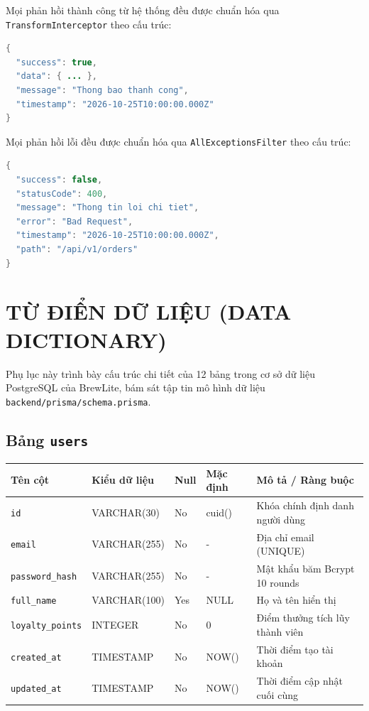 \documentclass[12pt,a4paper,oneside]{report}
\begin{document}
Mọi phản hồi thành công từ hệ thống đều được chuẩn hóa qua \texttt{Transform}\allowbreak\texttt{Interceptor} theo cấu trúc:
\begin{lstlisting}[language=Java]
{
  "success": true,
  "data": { ... },
  "message": "Thong bao thanh cong",
  "timestamp": "2026-10-25T10:00:00.000Z"
}
\end{lstlisting}

Mọi phản hồi lỗi đều được chuẩn hóa qua \texttt{AllExceptions}\allowbreak\texttt{Filter} theo cấu trúc:
\begin{lstlisting}[language=Java]
{
  "success": false,
  "statusCode": 400,
  "message": "Thong tin loi chi tiet",
  "error": "Bad Request",
  "timestamp": "2026-10-25T10:00:00.000Z",
  "path": "/api/v1/orders"
}
\end{lstlisting}



\chapter{TỪ ĐIỂN DỮ LIỆU (DATA DICTIONARY)}
\label{app:data-dictionary}

Phụ lục này trình bày cấu trúc chi tiết của 12 bảng trong cơ sở dữ liệu PostgreSQL của BrewLite, bám sát tập tin mô hình dữ liệu \texttt{backend/prisma/schema.prisma}.

\section{Bảng \texttt{users}}
\begin{table}[H]
\centering
\small
\begin{tabularx}{\textwidth}{llllX}
\toprule
\textbf{Tên cột} & \textbf{Kiểu dữ liệu} & \textbf{Null} & \textbf{Mặc định} & \textbf{Mô tả / Ràng buộc} \\
\midrule
\texttt{id} & VARCHAR(30) & No & cuid() & Khóa chính định danh người dùng \\
\texttt{email} & VARCHAR(255) & No & - & Địa chỉ email (UNIQUE) \\
\texttt{password\_hash} & VARCHAR(255) & No & - & Mật khẩu băm Bcrypt 10 rounds \\
\texttt{full\_name} & VARCHAR(100) & Yes & NULL & Họ và tên hiển thị \\
\texttt{loyalty\_points} & INTEGER & No & 0 & Điểm thưởng tích lũy thành viên \\
\texttt{created\_at} & TIMESTAMP & No & NOW() & Thời điểm tạo tài khoản \\
\texttt{updated\_at} & TIMESTAMP & No & NOW() & Thời điểm cập nhật cuối cùng \\
\bottomrule
\end{tabularx}
\end{table}
\end{document}
